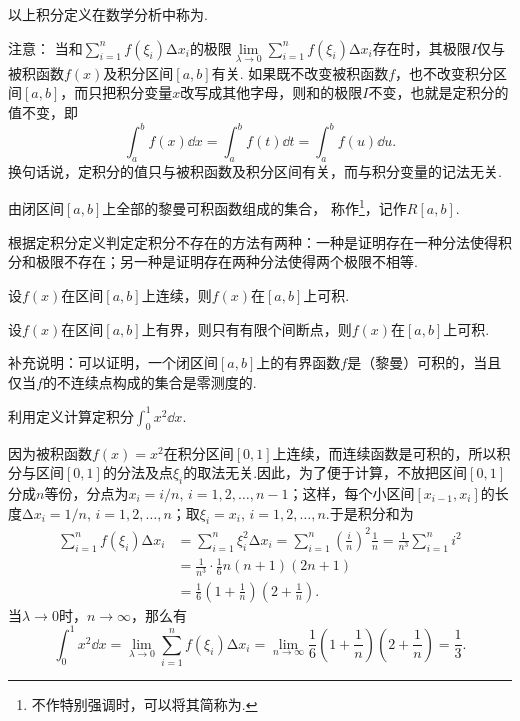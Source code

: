 以上积分定义在数学分析中称为.

注意：
当和\(\sum\limits_{i=1}^n f(\xi_i) \increment x_i\)的极限\(\lim\limits_{\lambda\to0} \sum\limits_{i=1}^n f(\xi_i) \increment x_i\)存在时，其极限\(I\)仅与被积函数\(f(x)\)及积分区间\([a,b]\)有关.
如果既不改变被积函数\(f\)，也不改变积分区间\([a,b]\)，而只把积分变量\(x\)改写成其他字母，则和的极限\(I\)不变，也就是定积分的值不变，即\[
\int_a^b f(x) \dd{x}
= \int_a^b f(t) \dd{t}
= \int_a^b f(u) \dd{u}.
\]
换句话说，定积分的值只与被积函数及积分区间有关，而与积分变量的记法无关.

\begin{definition}\label{definition:函数族.黎曼可积函数族}
由闭区间\([a,b]\)上全部的黎曼可积函数组成的集合，
称作\footnote{%
不作特别强调时，可以将其简称为.%
}，记作\(R[a,b]\).
\end{definition}

\begin{example}[用定义法证明定积分不存在]
根据定积分定义判定定积分不存在的方法有两种：一种是证明存在一种分法使得积分和极限不存在；另一种是证明存在两种分法使得两个极限不相等.
\end{example}

\begin{theorem}[函数可积的充分条件I]
设\(f(x)\)在区间\([a,b]\)上连续，则\(f(x)\)在\([a,b]\)上可积.
\end{theorem}

\begin{theorem}[函数可积的充分条件II]
设\(f(x)\)在区间\([a,b]\)上有界，则只有有限个间断点，则\(f(x)\)在\([a,b]\)上可积.
\end{theorem}

补充说明：可以证明，一个闭区间\([a,b]\)上的有界函数\(f\)是（黎曼）可积的，当且仅当\(f\)的不连续点构成的集合是零测度的.

\begin{example}
利用定义计算定积分\(\int_0^1 x^2 \dd{x}\).
\begin{solution}
因为被积函数\(f(x) = x^2\)在积分区间\([0,1]\)上连续，而连续函数是可积的，所以积分与区间\([0,1]\)的分法及点\(\xi_i\)的取法无关.因此，为了便于计算，不放把区间\([0,1]\)分成\(n\)等份，分点为\(x_i = i/n,\,i=1,2,\dotsc,n-1\)；这样，每个小区间\([x_{i-1},x_i]\)的长度\(\increment x_i = 1/n,\,i=1,2,\dotsc,n\)；取\(\xi_i=x_i,\,i=1,2,\dotsc,n\).于是积分和为\begin{align*}
\sum\limits_{i=1}^n f(\xi_i) \increment x_i
&= \sum\limits_{i=1}^n \xi_i^2 \increment x_i
= \sum\limits_{i=1}^n \left(\frac{i}{n}\right)^2 \frac{1}{n}
= \frac{1}{n^3} \sum\limits_{i=1}^n i^2 \\
&= \frac{1}{n^3} \cdot \frac{1}{6} n(n+1)(2n+1) \\
&= \frac{1}{6} \left(1+\frac{1}{n}\right) \left(2+\frac{1}{n}\right).
\end{align*}
当\(\lambda\to0\)时，\(n\to\infty\)，那么有\[
\int_0^1 x^2 \dd{x}
= \lim\limits_{\lambda\to0} \sum\limits_{i=1}^n f(\xi_i) \increment x_i
= \lim\limits_{n\to\infty} \frac{1}{6} \left(1+\frac{1}{n}\right) \left(2+\frac{1}{n}\right)
= \frac{1}{3}.
\]
\end{solution}
\end{example}

